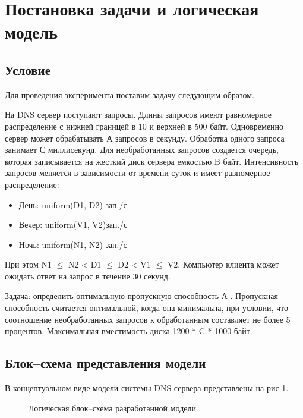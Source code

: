 \newpage
\section{Постановка задачи и логическая модель}
\subsection{Условие}
Для проведения эксперимента поставим задачу следующим образом.

На DNS сервер поступают запросы. Длины запросов имеют равномерное распределение с нижней границей
в 10 и верхней в 500 байт. Одновременно сервер может обрабатывать А запросов в секунду. Обработка одного
запроса занимает С миллисекунд. Для необработанных запросов создается очередь, которая записывается
на жесткий диск сервера емкостью B байт. Интенсивность запросов меняется в зависимости от времени суток
и имеет равномерное распределение:
\begin{itemize}
    \item День: uniform(D1, D2) зап./с
    \item Вечер: uniform(V1, V2)зап./с
    \item Ночь: uniform(N1, N2) зап./с
\end{itemize}

При этом N1 $\leqslant$ N2 < D1 $\leqslant$ D2 < V1 $\leqslant$ V2.
Компьютер клиента может ожидать ответ на запрос в течение 30 секунд.

Задача: определить оптимальную пропускную способность А . Пропускная способность считается оптимальной,
когда она минимальна, при условии, что соотношение необработанных запросов к
обработанным составляет не более 5 процентов. Максимальная вместимость диска 1200 * C * 1000 байт.

\subsection{Блок--схема представления модели}
В концептуальном виде модели системы DNS сервера представлены на рис \ref{concept}.

\begin{figure} [h]
    \caption{Логическая блок--схема разработанной модели}
    \label{concept}
\end{figure}

